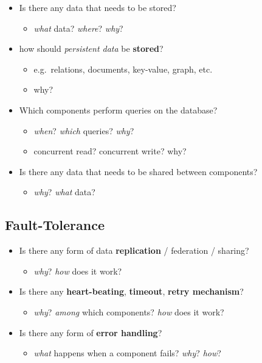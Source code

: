 \documentclass{scrartcl}
\begin{document}
\begin{itemize}
  \item Is there any data that needs to be stored?

  \begin{itemize}
    \item \emph{what} data? \emph{where}? \emph{why}?
  \end{itemize}
  \item how should \emph{persistent data} be \textbf{stored}?

  \begin{itemize}
    \item e.g.~relations, documents, key-value, graph, etc.
    \item why?
  \end{itemize}
  \item Which components perform queries on the database?

  \begin{itemize}
    \item \emph{when}? \emph{which} queries? \emph{why}?
    \item concurrent read? concurrent write? why?
  \end{itemize}
  \item Is there any data that needs to be shared between components?

  \begin{itemize}
    \item \emph{why}? \emph{what} data?
  \end{itemize}
\end{itemize}

\subsection{Fault-Tolerance}\label{fault-tolerance}

\begin{itemize}
  \item Is there any form of data \textbf{replication} / federation / sharing?

  \begin{itemize}
    \item \emph{why}? \emph{how} does it work?
  \end{itemize}
  \item Is there any \textbf{heart-beating}, \textbf{timeout}, \textbf{retry
  mechanism}?

  \begin{itemize}
    \item \emph{why}? \emph{among} which components? \emph{how} does it work?
  \end{itemize}
  \item Is there any form of \textbf{error handling}?

  \begin{itemize}
    \item \emph{what} happens when a component fails? \emph{why}? \emph{how}?
  \end{itemize}
\end{itemize}
\end{document}

